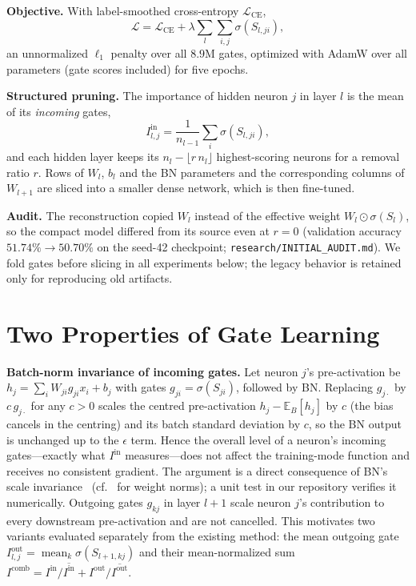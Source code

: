 \documentclass[conference]{IEEEtran}
\begin{document}
\textbf{Objective.} With label-smoothed cross-entropy $\mathcal{L}_{\mathrm{CE}}$,
\begin{equation}
\mathcal{L} = \mathcal{L}_{\mathrm{CE}} + \lambda \sum_l \sum_{i,j}\sigma(S_{l,ji}),
\end{equation}
an unnormalized $\ell_1$ penalty over all $8.9$M gates, optimized with AdamW over all
parameters (gate scores included) for five epochs.

\textbf{Structured pruning.} The importance of hidden neuron $j$ in layer $l$ is the mean
of its \emph{incoming} gates,
\begin{equation}
I^{\mathrm{in}}_{l,j} = \frac{1}{n_{l-1}}\sum_{i}\sigma(S_{l,ji}),
\end{equation}
and each hidden layer keeps its $n_l-\lfloor r\,n_l\rfloor$ highest-scoring neurons for
a removal ratio $r$. Rows of $W_l$, $b_l$ and the BN parameters and the corresponding
columns of $W_{l+1}$ are sliced into a smaller dense network, which is then
fine-tuned.

\textbf{Audit.} The reconstruction copied $W_l$ instead of the effective weight
$W_l\odot\sigma(S_l)$, so the compact model differed from its source even at $r=0$
(validation accuracy $51.74\%\to50.70\%$ on the seed-42 checkpoint;
\texttt{research/INITIAL\_AUDIT.md}). We fold gates before slicing in all experiments
below; the legacy behavior is retained only for reproducing old artifacts.

\section{Two Properties of Gate Learning}\label{sec:analysis}
\textbf{Batch-norm invariance of incoming gates.} Let neuron $j$'s pre-activation be
$h_j=\sum_i W_{ji} g_{ji} x_i + b_j$ with gates $g_{ji}=\sigma(S_{ji})$, followed by
BN. Replacing $g_{j\cdot}$ by $c\,g_{j\cdot}$ for any $c>0$ scales the centred
pre-activation $h_j-\mathbb{E}_B[h_j]$ by $c$ (the bias cancels in the centring) and its
batch standard deviation by $c$, so the BN output is unchanged up to the
$\epsilon$ term. Hence the overall level of a neuron's incoming gates---exactly what
$I^{\mathrm{in}}$ measures---does not affect the training-mode function and receives no
consistent gradient. The argument is a direct consequence of BN's scale
invariance~\cite{ioffe2015bn} (cf.\ \cite{ye2018rethinking} for weight norms); a unit test
in our repository verifies it numerically. Outgoing gates $g_{kj}$ in layer $l+1$ scale
neuron $j$'s contribution to every downstream pre-activation and are not cancelled.
This motivates two variants evaluated separately from the existing method: the mean
outgoing gate $I^{\mathrm{out}}_{l,j}=\operatorname{mean}_k \sigma(S_{l+1,kj})$ and their
mean-normalized sum $I^{\mathrm{comb}}=I^{\mathrm{in}}/\overline{I^{\mathrm{in}}}+
I^{\mathrm{out}}/\overline{I^{\mathrm{out}}}$.
\end{document}
